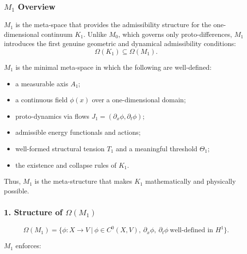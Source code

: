 

\subsubsection{\texorpdfstring{$M_1$}{M_1} Overview}
\label{sec:m1-overview}

$M_1$ is the meta-space that provides the admissibility structure for the
one-dimensional continuum $K_1$.  
Unlike $M_0$, which governs only proto-differences, $M_1$ introduces the
first genuine geometric and dynamical admissibility conditions:
\[
\Omega(K_1) \subseteq \Omega(M_1).
\]

$M_1$ is the minimal meta-space in which the following are well-defined:

\begin{itemize}
    \item a measurable axis $A_1$;
    \item a continuous field $\phi(x)$ over a one-dimensional domain;
    \item proto-dynamics via flows $J_1=(\partial_x \phi, \partial_t \phi)$;
    \item admissible energy functionals and actions;
    \item well-formed structural tension $T_1$ and a meaningful threshold $\Theta_1$;
    \item the existence and collapse rules of $K_1$.
\end{itemize}

Thus, $M_1$ is the meta-structure that makes $K_1$ mathematically and physically possible.

\subsubsection*{1. Structure of \texorpdfstring{$\Omega(M_1)$}{\Omega(M_1)}}

\[
\Omega(M_1)
=
\Big\{
\phi : X \to V \ \big|\
\phi \in C^{0}(X,V),\ 
\partial_x \phi,\ \partial_t \phi\ \text{well-defined in } H^1
\Big\}.
\]

$M_1$ enforces:

